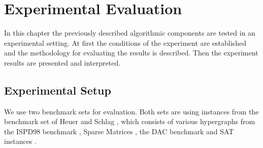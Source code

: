\documentclass[a4paper,12pt,titlepage, BCOR7mm,headsepline]{scrbook}
\numberwithin{equation}{section}
\begin{document}
% 

\chapter{Experimental Evaluation}
\label{chapter:experimentalevaluation}
In this chapter the previously described algorithmic components are tested in an experimental setting. At first the conditions of the experiment are established and the methodology for evaluating the results is described. Then the experiment results are presented and interpreted. 



\section{Experimental Setup}
We use two benchmark sets for evaluation. Both sets are using instances from the benchmark set of Heuer and Schlag \cite{heuer2017improving}, which consists of various hypergraphs from the ISPD98 benchmark \cite{alpert1998ispd98}, Sparse Matrices \cite{davis2011university}, the DAC benchmark \cite{viswanathan2012dac} and SAT instances \cite{belov2014proceedings}. 
\end{document}
